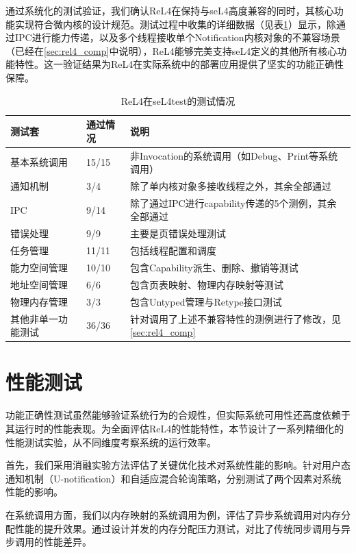 通过系统化的测试验证，我们确认ReL4在保持与seL4高度兼容的同时，其核心功能实现符合微内核的设计规范。测试过程中收集的详细数据（见表\ref{tab:seL4_test_info}）显示，除通过IPC进行能力传递，以及多个线程接收单个Notification内核对象的不兼容场景（已经在\ref{sec:rel4_comp}中说明），ReL4能够完美支持seL4定义的其他所有核心功能特性。这一验证结果为ReL4在实际系统中的部署应用提供了坚实的功能正确性保障。


\begin{table}[htbp]
    \centering
    \begin{tabular*}{1.0\textwidth}{@{\extracolsep{\fill}}lll}
    \toprule
    测试套			&通过情况 &说明	 \\
    \midrule
    基本系统调用			&15/15 & 非Invocation的系统调用（如Debug、Print等系统调用） \\
      通知机制			&3/4 & 除了单内核对象多接收线程之外，其余全部通过	 \\
      IPC &9/14 & 除了通过IPC进行capability传递的5个测例，其余全部通过	 \\
      错误处理  &9/9 & 主要是页错误处理测试\\
      任务管理	&11/11 & 包括线程配置和调度 \\
      能力空间管理 &10/10 & 包含Capability派生、删除、撤销等测试\\
      地址空间管理 &6/6 & 包含页表映射、物理内存映射等测试 \\
      物理内存管理 &3/3 & 包含Untyped管理与Retype接口测试  \\
      其他非单一功能测试 & 36/36 & 针对调用了上述不兼容特性的测例进行了修改，见\ref{sec:rel4_comp} \\
    \bottomrule
    \end{tabular*}
    \caption{ReL4在seL4test的测试情况} \label{tab:seL4_test_info}
  \end{table}

\section{性能测试}
功能正确性测试虽然能够验证系统行为的合规性，但实际系统可用性还高度依赖于其运行时的性能表现。为全面评估ReL4的性能特性，本节设计了一系列精细化的性能测试实验，从不同维度考察系统的运行效率。

首先，我们采用消融实验方法评估了关键优化技术对系统性能的影响。针对用户态通知机制（U-notification）和自适应混合轮询策略，分别测试了两个因素对系统性能的影响。

在系统调用方面，我们以内存映射的系统调用为例，评估了异步系统调用对内存分配性能的提升效果。通过设计并发的内存分配压力测试，对比了传统同步调用与异步调用的性能差异。

